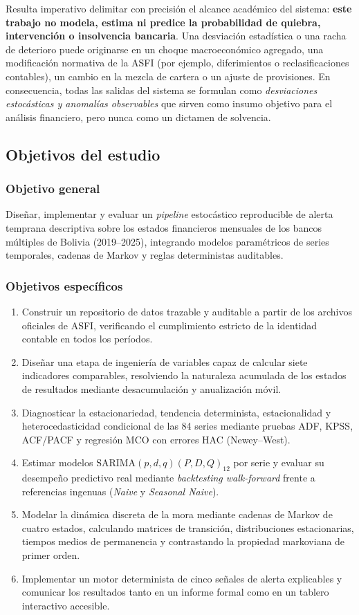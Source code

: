 \documentclass[11pt,letterpaper]{article}
\begin{document}
Resulta imperativo delimitar con precisión el alcance académico del sistema: \textbf{este trabajo no modela, estima ni predice la probabilidad de quiebra, intervención o insolvencia bancaria}. Una desviación estadística o una racha de deterioro puede originarse en un choque macroeconómico agregado, una modificación normativa de la ASFI (por ejemplo, diferimientos o reclasificaciones contables), un cambio en la mezcla de cartera o un ajuste de provisiones. En consecuencia, todas las salidas del sistema se formulan como \emph{desviaciones estocásticas y anomalías observables} que sirven como insumo objetivo para el análisis financiero, pero nunca como un dictamen de solvencia.

\subsection{Objetivos del estudio}

\subsubsection*{Objetivo general}
Diseñar, implementar y evaluar un \emph{pipeline} estocástico reproducible de alerta temprana descriptiva sobre los estados financieros mensuales de los bancos múltiples de Bolivia (2019--2025), integrando modelos paramétricos de series temporales, cadenas de Markov y reglas deterministas auditables.

\subsubsection*{Objetivos específicos}
\begin{enumerate}[leftmargin=1.5em]
  \item Construir un repositorio de datos trazable y auditable a partir de los archivos oficiales de ASFI, verificando el cumplimiento estricto de la identidad contable en todos los períodos.
  \item Diseñar una etapa de ingeniería de variables capaz de calcular siete indicadores comparables, resolviendo la naturaleza acumulada de los estados de resultados mediante desacumulación y anualización móvil.
  \item Diagnosticar la estacionariedad, tendencia determinista, estacionalidad y heterocedasticidad condicional de las 84 series mediante pruebas ADF, KPSS, ACF/PACF y regresión MCO con errores HAC (Newey--West).
  \item Estimar modelos \(\text{SARIMA}(p,d,q)(P,D,Q)_{12}\) por serie y evaluar su desempeño predictivo real mediante \emph{backtesting walk-forward} frente a referencias ingenuas (\emph{Naive} y \emph{Seasonal Naive}).
  \item Modelar la dinámica discreta de la mora mediante cadenas de Markov de cuatro estados, calculando matrices de transición, distribuciones estacionarias, tiempos medios de permanencia y contrastando la propiedad markoviana de primer orden.
  \item Implementar un motor determinista de cinco señales de alerta explicables y comunicar los resultados tanto en un informe formal como en un tablero interactivo accesible.
\end{enumerate}
\end{document}
